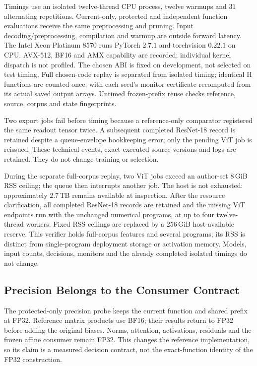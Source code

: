 Timings use an isolated twelve-thread CPU process, twelve warmups and
$31$ alternating repetitions. Current-only, protected and independent
function evaluations receive the same preprocessing and pruning. Input
decoding/preprocessing, compilation and warmup are outside forward latency.
The Intel Xeon Platinum 8570 runs PyTorch $2.7.1$ and torchvision
$0.22.1$ on CPU. AVX-512, BF16 and AMX capability are recorded; individual
kernel dispatch is not profiled.
The chosen ABI is fixed on development, not selected on test timing. Full
chosen-code replay is separated from isolated timing; identical H functions
are counted once, with each seed's monitor certificate recomputed from its
actual saved output arrays. Untimed frozen-prefix reuse checks reference,
source, corpus and state fingerprints.

Two export jobs fail before timing because a reference-only comparator
registered the same readout tensor twice. A subsequent completed ResNet-18
record is retained despite a queue-envelope bookkeeping error; only the
pending ViT job is reissued. These technical events, exact executed source
versions and logs are retained. They do not change training or selection.

During the separate full-corpus replay, two ViT jobs exceed an author-set
$8$\,GiB RSS ceiling; the queue then interrupts another job. The host is
not exhausted: approximately $2.7$\,TB remains available at inspection.
After the resource clarification, all completed ResNet-18 records are retained
and the missing ViT endpoints run with the unchanged numerical programs,
at up to four twelve-thread workers. Fixed RSS ceilings are replaced by a
$256$\,GiB host-available reserve. This verifier holds full-corpus features
and several programs; its RSS is distinct from single-program deployment
storage or activation memory. Models, input counts, decisions, monitors
and the already completed isolated timings do not change.

\subsection{Precision Belongs to the Consumer Contract}\label{app:reference_precision}

The protected-only precision probe keeps the current function and shared
prefix at FP32. Reference matrix products use BF16; their results return to
FP32 before adding the original biases. Norms, attention, activations,
residuals and the frozen affine consumer remain FP32. This changes the
reference implementation, so its claim is a measured decision contract,
not the exact-function identity of the FP32 construction.

